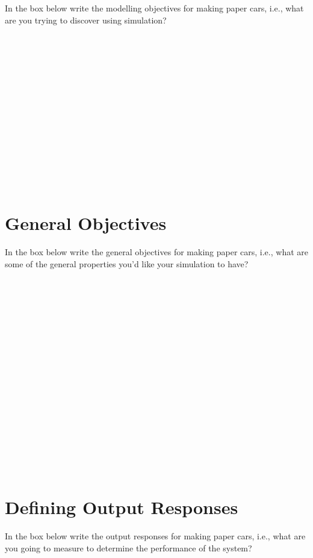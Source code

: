 \documentclass[
  10pt,
  a4paperpaper,
  DIV=11,
  numbers=noendperiod,
  oneside]{scrreprt}
\begin{document}
In the box below write the modelling objectives for making paper cars,
i.e., what are you trying to discover using simulation?

\begin{figure}

\begin{mdframed}[innerbottommargin=3cm]

~

~

~

~

~

~

~

~

\end{mdframed}

\end{figure}%

\newpage{}

\section{General Objectives}\label{general-objectives}

In the box below write the general objectives for making paper cars,
i.e., what are some of the general properties you'd like your simulation
to have?

\begin{figure}

\begin{mdframed}[innerbottommargin=4.5cm]

~

~

~

~

~

~

~

~

~

~

\end{mdframed}

\end{figure}%

\section{Defining Output Responses}\label{defining-output-responses-1}

In the box below write the output responses for making paper cars, i.e.,
what are you going to measure to determine the performance of the
system?
\end{document}
